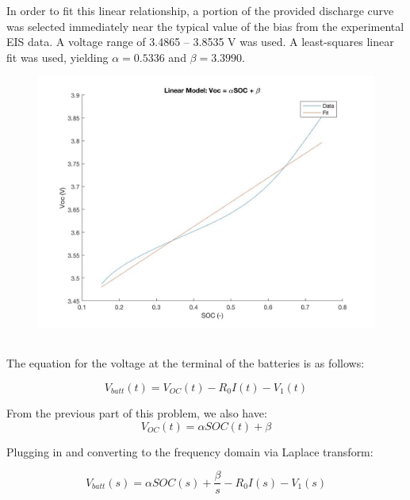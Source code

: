 \documentclass[a4paper,12pt]{extarticle}
\begin{document}
In order to fit this linear relationship, a portion of the provided discharge curve was selected immediately near the typical value of the bias from the experimental EIS data. A voltage range of 3.4865 – 3.8535 V was used. A least-squares linear fit was used, yielding \(\alpha = 0.5336\) and \(\beta = 3.3990\).

\begin{figure}[h]
\centering
\includegraphics[width=\textwidth]{SOC_Voc.jpg}
\end{figure}

\subsection{}

The equation for the voltage at the terminal of the batteries is as follows:

\begin{equation} \label{}
V_{batt}(t) = V_{OC}(t) - R_0I(t) - V_1(t)
\end{equation}

From the previous part of this problem, we also have: 
\begin{equation} \label{}
V_{OC}(t) = \alpha SOC(t) + \beta
\end{equation}

Plugging in and converting to the frequency domain via Laplace transform:

\begin{equation} \label{}
V_{batt}(s) = \alpha SOC(s) + \frac{\beta}{s} - R_0I(s) - V_1(s)
\end{equation}
\end{document}
